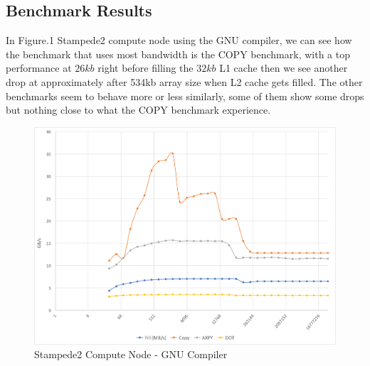 \documentclass[12pt]{article} %
\begin{document}
\begin{table}[ht]
\end{table}

\newpage

\subsection{Benchmark Results}

In Figure.1 Stampede2 compute node using the GNU compiler, we can see how the benchmark that uses most bandwidth is the \textsc{COPY} benchmark, with a top performance at $26kb$ right before filling the $32kb$ L1 cache then we see another drop at approximately after 534kb array size when L2 cache gets  filled. The other benchmarks seem to behave more or less similarly, some of them show some drops but nothing close to what the \textsc{COPY} benchmark experience.

\begin{figure}[htb]
\caption{Stampede2 Compute Node - GNU Compiler}\label{fig:benchmark01}
\centering
\includegraphics[width=\textwidth,keepaspectratio]{imgs/img01.png}
\end{figure} 
\end{document}
